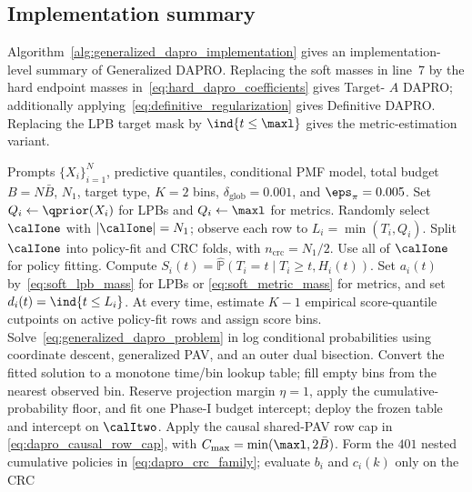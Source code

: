 \subsection{Implementation summary}

Algorithm~\ref{alg:generalized_dapro_implementation} gives an implementation-
level summary of Generalized DAPRO.  Replacing the soft masses in line~7 by
the hard endpoint masses in~\eqref{eq:hard_dapro_coefficients} gives Target-
$A$ DAPRO; additionally applying~\eqref{eq:definitive_regularization} gives
Definitive DAPRO.  Replacing the LPB target mask by
$\ind{t\leq\maxl}$ gives the metric-estimation variant.

\begin{algorithm}[htbp]
\caption{Generalized DAPRO for LPB construction or metric estimation}
\label{alg:generalized_dapro_implementation}
\begin{algorithmic}[1]
\REQUIRE Prompts $\{X_i\}_{i=1}^N$, predictive quantiles, conditional PMF
model, total budget $B=N\bar B$, $N_1$, target type, $K=2$ bins,
$\delta_{\mathrm{glob}}=0.001$, and $\eps_\pi=0.005$.
\STATE Set $Q_i\gets\qprior(X_i)$ for LPBs and $Q_i\gets\maxl$ for metrics.
\STATE Randomly select $\calIone$ with $|\calIone|=N_1$; observe each row to
$L_i=\min(T_i,Q_i)$.
    \STATE Split $\calIone$ into policy-fit and CRC folds, with
    $n_{\mathrm{crc}}=N_1/2$.
\ELSE
    \STATE Use all of $\calIone$ for policy fitting.
\ENDIF
{}
    \STATE Compute $S_i(t)=\widehat{\mathbb P}(T_i=t\mid T_i\geq t,H_i(t))$.
    \STATE Set $a_i(t)$ by~\eqref{eq:soft_lpb_mass} for LPBs or
    \eqref{eq:soft_metric_mass} for metrics, and set $d_i(t)=\ind{t\leq L_i}$.
\ENDFOR
\STATE At every time, estimate $K-1$ empirical score-quantile cutpoints on
active policy-fit rows and assign score bins.
\STATE Solve~\eqref{eq:generalized_dapro_problem} in log conditional
probabilities using coordinate descent, generalized PAV, and an outer dual
bisection.
\STATE Convert the fitted solution to a monotone time/bin lookup table; fill
empty bins from the nearest observed bin.
    \STATE Reserve projection margin $\eta=1$, apply the cumulative-probability
    floor, and fit one Phase-I budget intercept; deploy the frozen table and
    intercept on $\calItwo$.
\ELSE
    \STATE Apply the causal shared-PAV row cap in
    \eqref{eq:dapro_causal_row_cap}, with
    $C_{\max}=\min(\maxl,2\bar B)$.
    \STATE Form the $401$ nested cumulative policies in
    \eqref{eq:dapro_crc_family}; evaluate $b_i$ and $c_i(k)$ only on the CRC

\end{algorithmic}
\end{algorithm}
